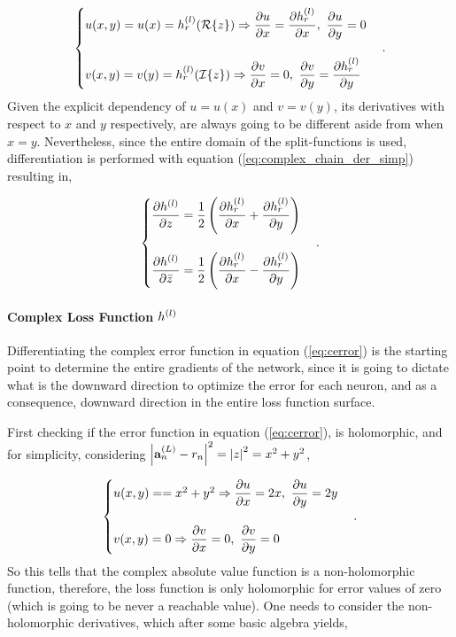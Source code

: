\begin{equation}
	\begin{cases}
		u(x,y) = u(x) = \af{l}_r(\Real{z}) \Rightarrow \der{u}{x} = \der{\af{l}_r}{x}, \ \der{u}{y} = 0 \\
		\\
		v(x,y) = v(y) = \af{l}_r(\Imag{z}) \Rightarrow \der{v}{x} = 0, \ \der{v}{y} = \der{\af{l}_r}{y}
	\end{cases}.
	\label{eq:creq_split}
\end{equation}
Given the explicit dependency of $ u = u(x) $ and $ v = v(y) $, its derivatives with respect to $ x $ and $ y $ respectively, are always going to be different aside from when $ x = y $. Nevertheless, since the entire domain of the split-functions is used, differentiation is performed with equation
(\ref{eq:complex_chain_der_simp}) resulting in,

\begin{equation}
	\begin{cases}
		\dfrac{\partial h^{(l)}}{\partial z} = \dfrac{1}{2} \left( \dfrac{\partial h^{(l)}_r}{\partial x} + \dfrac{\partial h^{(l)}_r}{\partial y} \right) \\
		\\
		\dfrac{\partial h^{(l)}}{\partial \bar{z}} = \dfrac{1}{2} \left( \dfrac{\partial h^{(l)}_r}{\partial x} - \dfrac{\partial h^{(l)}_r}{\partial y} \right)
	\end{cases}.
\end{equation}

\paragraph{Complex Loss Function $ h^{(l)} $}
Differentiating the complex error function in equation (\ref{eq:cerror}) is the starting point to determine the entire gradients of the network, since it is going to dictate what is the downward direction to optimize the error for each neuron, and as a consequence, downward direction in the entire loss function surface.

First checking if the error function in equation (\ref{eq:cerror}), is holomorphic, and for simplicity, considering $ \left| \mathbf{a}^{(L)}_{n} - r_n \right|^2 = \left| z \right|^2 = x^2 + y^2 $,

\begin{equation}
	\begin{cases}
		u(x,y) =  = x^2 + y^2 \Rightarrow \dfrac{\partial u}{\partial x} = 2x, \ \dfrac{\partial u}{\partial y} = 2y \\
		\\
		v(x,y) = 0 \Rightarrow \dfrac{\partial v}{\partial x} = 0, \ \dfrac{\partial v}{\partial y} = 0
	\end{cases}.
\end{equation}
So this tells that the complex absolute value function is a non-holomorphic function, therefore, the loss function is only holomorphic for error values of zero (which is going to be never a reachable value). One needs to consider the non-holomorphic derivatives, which after some basic algebra yields,

